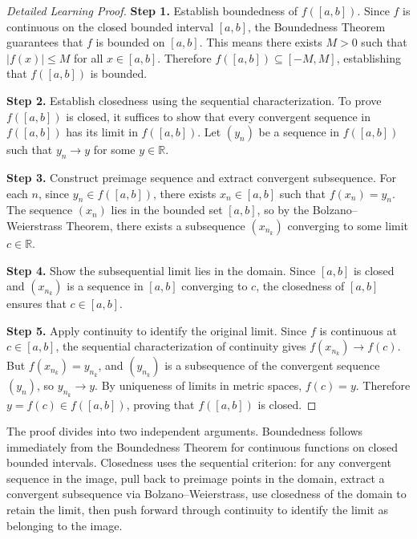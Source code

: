 \begin{proof}[Detailed Learning Proof]
\LRAProofBodyStart

\textbf{Step 1.} Establish boundedness of $f([a,b])$. Since $f$ is continuous on the closed bounded interval $[a,b]$, the Boundedness Theorem guarantees that $f$ is bounded on $[a,b]$. This means there exists $M > 0$ such that $|f(x)| \leq M$ for all $x \in [a,b]$. Therefore $f([a,b]) \subseteq [-M, M]$, establishing that $f([a,b])$ is bounded.

\textbf{Step 2.} Establish closedness using the sequential characterization. To prove $f([a,b])$ is closed, it suffices to show that every convergent sequence in $f([a,b])$ has its limit in $f([a,b])$. Let $(y_n)$ be a sequence in $f([a,b])$ such that $y_n \to y$ for some $y \in \mathbb{R}$.

\textbf{Step 3.} Construct preimage sequence and extract convergent subsequence. For each $n$, since $y_n \in f([a,b])$, there exists $x_n \in [a,b]$ such that $f(x_n) = y_n$. The sequence $(x_n)$ lies in the bounded set $[a,b]$, so by the Bolzano--Weierstrass Theorem, there exists a subsequence $(x_{n_k})$ converging to some limit $c \in \mathbb{R}$.

\textbf{Step 4.} Show the subsequential limit lies in the domain. Since $[a,b]$ is closed and $(x_{n_k})$ is a sequence in $[a,b]$ converging to $c$, the closedness of $[a,b]$ ensures that $c \in [a,b]$.

\textbf{Step 5.} Apply continuity to identify the original limit. Since $f$ is continuous at $c \in [a,b]$, the sequential characterization of continuity gives $f(x_{n_k}) \to f(c)$. But $f(x_{n_k}) = y_{n_k}$, and $(y_{n_k})$ is a subsequence of the convergent sequence $(y_n)$, so $y_{n_k} \to y$. By uniqueness of limits in metric spaces, $f(c) = y$. Therefore $y = f(c) \in f([a,b])$, proving that $f([a,b])$ is closed.
\end{proof}

\begin{remark*}
The proof divides into two independent arguments. Boundedness follows immediately from the Boundedness Theorem for continuous functions on closed bounded intervals. Closedness uses the sequential criterion: for any convergent sequence in the image, pull back to preimage points in the domain, extract a convergent subsequence via Bolzano--Weierstrass, use closedness of the domain to retain the limit, then push forward through continuity to identify the limit as belonging to the image.
\end{remark*}


